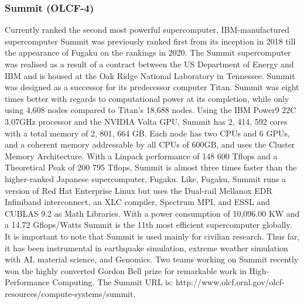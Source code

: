 \documentclass{article}
\begin{document}
\subsubsection{Summit (OLCF-4)}
Currently ranked the second most powerful supercomputer, IBM-manufactured supercomputer Summit was previously ranked first from its inception in 2018 till the appearance of Fugaku on the rankings in 2020. The Summit supercomputer was realised as a result of a contract between the US Department of Energy and IBM and is housed at the Oak Ridge National Laboratory in Tennessee. Summit was designed as a successor for its predecessor computer Titan. Summit was eight times better with regards to computational power at its completion, while only using 4,608 nodes compared to Titan's 18,688 nodes. Using the IBM Power9 22C 3.07GHz processor and the NVIDIA Volta GPU, Summit has 2, 414, 592 cores with a total memory of 2, 801, 664 GB. Each node has two CPUs and 6 GPUs, and a coherent memory addressable by all CPUs of 600GB, and uses the Cluster Memory Architecture. With a Linpack performance of 148 600 Tflops and a Theoretical Peak of 200 795 Tflops, Summit is almost three times faster than the higher-ranked Japanese supercomputer, Fugaku. Like, Fugaku, Summit runs a version of Red Hat Enterprise Linux but uses the Dual-rail Mellanox EDR Infiniband interconnect, an XLC compiler, Spectrum MPI, and ESSL and CUBLAS 9.2 as Math Libraries. With a power consumption of 10,096.00 KW and a 14.72 Gflops/Watts Summit is the 11th most efficient supercomputer globally. It is important to note that Summit is used mainly for civilian research. Thus far, it has been instrumental in earthquake simulation, extreme weather simulation with AI, material science, and Genomics. Two teams working on Summit recently won the highly converted Gordon Bell prize for remarkable work in High-Performance Computing. The Summit URL is: http://www.olcf.ornl.gov/olcf-resources/compute-systems/summit. 
\end{document}
